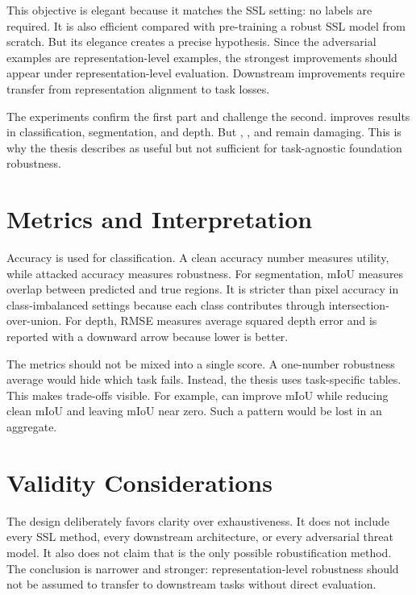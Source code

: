 This objective is elegant because it matches the SSL setting: no labels are required. It is also efficient compared with pre-training a robust SSL model from scratch. But its elegance creates a precise hypothesis. Since the adversarial examples are representation-level examples, the strongest improvements should appear under representation-level evaluation. Downstream improvements require transfer from representation alignment to task losses.

The experiments confirm the first part and challenge the second. \DeACL improves \EmbedAttack results in classification, segmentation, and depth. But \PGD, \SegPGD, and \DepthPGD remain damaging. This is why the thesis describes \DeACL as useful but not sufficient for task-agnostic foundation robustness.

\section{Metrics and Interpretation}

Accuracy is used for classification. A clean accuracy number measures utility, while attacked accuracy measures robustness. For segmentation, mIoU measures overlap between predicted and true regions. It is stricter than pixel accuracy in class-imbalanced settings because each class contributes through intersection-over-union. For depth, RMSE measures average squared depth error and is reported with a downward arrow because lower is better.

The metrics should not be mixed into a single score. A one-number robustness average would hide which task fails. Instead, the thesis uses task-specific tables. This makes trade-offs visible. For example, \DeACL can improve \EmbedAttack mIoU while reducing clean mIoU and leaving \SegPGD mIoU near zero. Such a pattern would be lost in an aggregate.

\section{Validity Considerations}

The design deliberately favors clarity over exhaustiveness. It does not include every SSL method, every downstream architecture, or every adversarial threat model. It also does not claim that \DeACL is the only possible robustification method. The conclusion is narrower and stronger: representation-level robustness should not be assumed to transfer to downstream tasks without direct evaluation.

